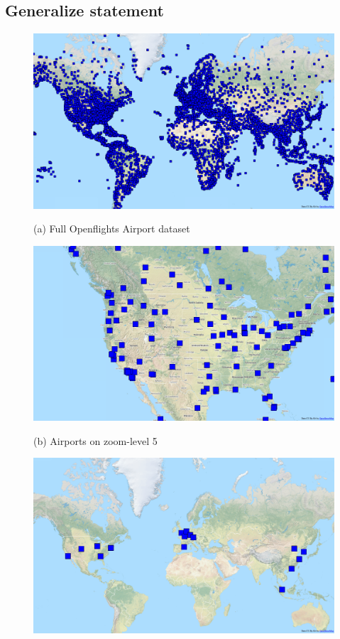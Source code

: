 \documentclass[11pt, oneside]{report}
\begin{document}
{\subsection{Generalize statement}
\label{sec:cvl:generalize:statement}

\begin{figure}[tb]
  \begin{minipage}{0.329\linewidth}
    \centerline{\includegraphics[width=0.95\linewidth]{./figs-cvl/airports.png}}
    \centerline{(a) Full Openflights Airport dataset}
  \end{minipage} \hfill
  \begin{minipage}{0.329\linewidth}
    \centerline{\includegraphics[width=0.95\linewidth]{./figs-cvl/airports_z4.png}}
    \centerline{(b) Airports on zoom-level 5}
  \end{minipage} \hfill
  \begin{minipage}{0.329\linewidth}
    \centerline{\includegraphics[width=0.95\linewidth]{./figs-cvl/airports_z0.png}}

\end{minipage}
\end{figure}}
\end{document}
